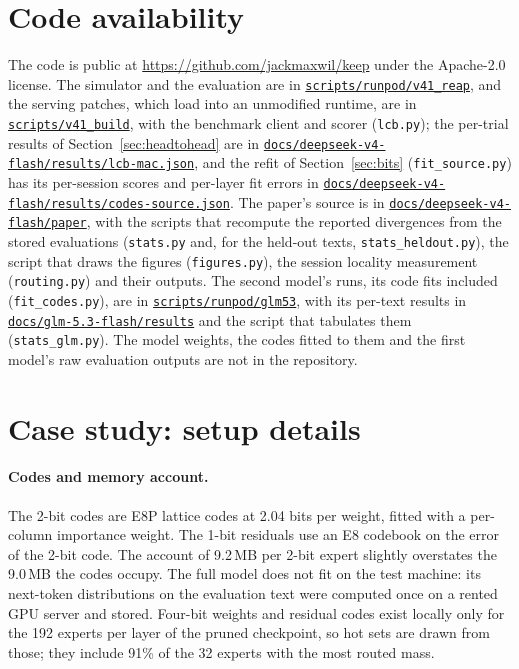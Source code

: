 \documentclass[11pt]{article}
\newcommand{\repo}{https://github.com/jackmaxwil/keep}
\newcommand{\src}[1]{\href{\repo/blob/main/#1}{\nolinkurl{#1}}}
\begin{document}
\section*{Code availability}

The code is public at \url{https://github.com/jackmaxwil/keep} under the Apache-2.0 license. The simulator and the evaluation are in
\src{scripts/runpod/v41_reap}, and the serving patches, which load into an unmodified runtime,
are in \src{scripts/v41_build}, with the benchmark client and scorer (\texttt{lcb.py}); the per-trial results of Section~\ref{sec:headtohead} are in \src{docs/deepseek-v4-flash/results/lcb-mac.json}, and the refit of Section~\ref{sec:bits} (\texttt{fit\_source.py}) has its per-session scores and per-layer fit errors in \src{docs/deepseek-v4-flash/results/codes-source.json}. The paper's source is in \src{docs/deepseek-v4-flash/paper},
with the scripts that recompute the reported divergences from the stored evaluations
(\texttt{stats.py} and, for the held-out texts, \texttt{stats\_heldout.py}), the script that draws the figures (\texttt{figures.py}), the session
locality measurement (\texttt{routing.py}) and their outputs. The second model's runs, its code fits included (\texttt{fit\_codes.py}), are in \src{scripts/runpod/glm53}, with its per-text results in \src{docs/glm-5.3-flash/results} and the script that tabulates them (\texttt{stats\_glm.py}). The model weights, the codes
fitted to them and the first model's raw evaluation outputs are not in the repository.

\appendix

\section{Case study: setup details}
\label{app:setup}

\paragraph{Codes and memory account.} The 2-bit codes are E8P lattice codes at 2.04 bits per
weight, fitted with a per-column importance weight. The 1-bit residuals use an E8 codebook on
the error of the 2-bit code. The account of 9.2\,MB per 2-bit expert slightly overstates the
9.0\,MB the codes occupy. The full model does not fit on the test machine: its next-token
distributions on the evaluation text were computed once on a rented GPU server and stored.
Four-bit weights and residual codes exist locally only for the 192 experts per layer of the
pruned checkpoint, so hot sets are drawn from those; they include 91\% of the 32 experts with
the most routed mass.
\end{document}
